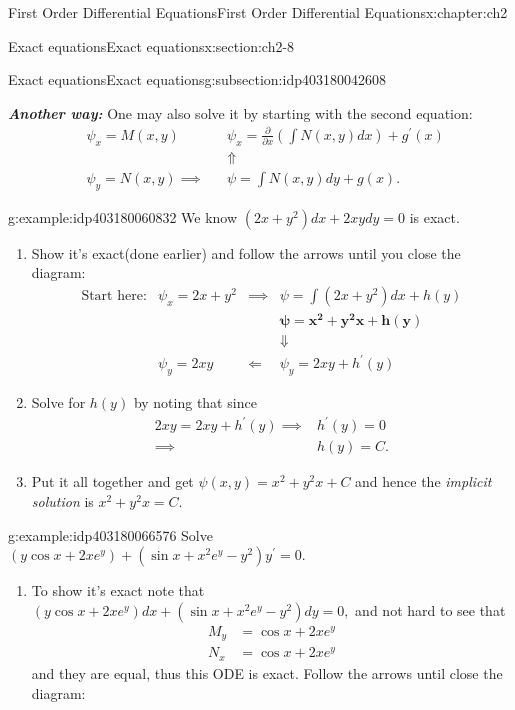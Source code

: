 \documentclass[oneside,10pt,]{book}
\newcommand{\alert}[1]{\textbf{\textit{#1}}}
\numberwithin{equation}{section}
\numberwithin{equation}{section}
\newcommand{\amp}{&}
\begin{document}
\begin{chapterptx}{First Order Differential Equations}{}{First Order Differential Equations}{}{}{x:chapter:ch2}
\begin{sectionptx}{Exact equations}{}{Exact equations}{}{}{x:section:ch2-8}
\begin{subsectionptx}{Exact equations}{}{Exact equations}{}{}{g:subsection:idp403180042608}
\par
\alert{Another way:} One may also solve it by starting with the second equation:%
\begin{align*}
\amp \psi_{x}=M(x,y) \amp \amp \psi_{x}=\frac{\partial}{\partial x}\left(\int N(x,y)dx\right)+g^{\prime}(x)\\
\amp \amp \amp \Uparrow\\
\amp\psi_{y}=N(x,y)\implies \amp \amp\psi=\int N(x,y)dy+g(x).
\end{align*}
%
\begin{example}{}{g:example:idp403180060832}%
We know \(\left(2x+y^{2}\right)dx+2xydy=0\) is exact.%
\begin{enumerate}
\item{}Show it's exact(done earlier) and follow the arrows until you close the diagram:%
\begin{align*}
\text{Start here:} \amp \psi_{x}=2x+y^{2} \amp \implies \amp \psi=\int\left(2x+y^{2}\right)dx+h(y)\\
\amp  \amp  \amp \boldsymbol{\psi=x^{2}+y^{2}x+h(y)}\\
\amp  \amp  \amp \Downarrow\\
\amp \psi_{y}=2xy \amp \Longleftarrow \amp \psi_{y}=2xy+h^{\prime}(y)
\end{align*}
%
\item{}Solve for \(h(y)\) by noting that since%
\begin{align*}
2xy=2xy+h^{\prime}(y)\implies \amp h^{\prime}(y)=0\\
\implies \amp h(y)=C.
\end{align*}
%
\item{}Put it all together and get \(\psi(x,y)=x^{2}+y^{2}x+C\) and hence the \emph{implicit solution} is \(x^{2}+y^{2}x=C.\)%
\end{enumerate}
%
\end{example}
\begin{example}{}{g:example:idp403180066576}%
Solve \(\left(y\cos x+2xe^{y}\right)+\left(\sin x+x^{2}e^{y}-y^{2}\right)y^{\prime}=0.\)%
\par
%
\begin{enumerate}
\item{}To show it's exact note that \(\left(y\cos x+2xe^{y}\right)dx+\left(\sin x+x^{2}e^{y}-y^{2}\right)dy=0,\) and not hard to see that%
\begin{align*}
M_{y} \amp =\cos x+2xe^{y}\\
N_{x} \amp =\cos x+2xe^{y}
\end{align*}
and they are equal, thus this ODE is exact. Follow the arrows until close the diagram:%

\end{enumerate}
\end{example}
\end{subsectionptx}
\end{sectionptx}
\end{chapterptx}
\end{document}
